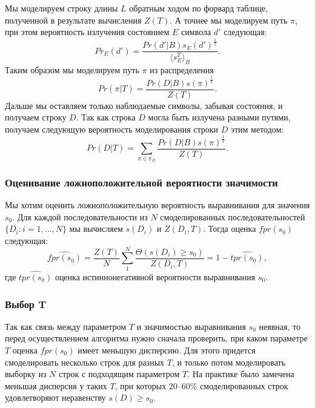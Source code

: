 \documentclass[]{article}
\begin{document}
			Мы моделируем строку длины $L$ обратным ходом по форвард таблице, полученной в результате вычисления $Z(T)$. А точнее мы моделируем путь $\pi$, при этом вероятность излучения состоянием $E$ символа $d'$ следующая:
			\begin{equation}
				Pr_{E}(d') = \frac{Pr(d'|B)s_{E}(d')^{\frac{1}{T}}} {\langle s_{E}^{T} \rangle_{B}}.
			\end{equation}			
			Таким образом мы моделируем путь $\pi$ из распределения 
			\begin{equation}
				Pr(\pi|T) = \frac{Pr(D|B)s(\pi)^{\frac{1}{T}}}{Z(T)}.
			\end{equation}
			Дальше мы оставляем только наблюдаемые символы, забывая состояния, и получаем строку $D$. Так как строка $D$ могла быть излучена разными путями, получаем следующую вероятность моделирования строки $D$ этим методом:
			\begin{equation}				
				Pr(D|T) = \sum_{\pi \in \pi_{D}} \frac{Pr(D|B)s(\pi)^{\frac{1}{T}}}{Z(T)}.
			\end{equation}	
			
			\subsubsection{Оценивание ложноположительной вероятности значимости}			
			Мы хотим оценить ложноположительную вероятность выравнивания для значения $s_{0}$. Для каждой последовательности из $N$ смоделированных последовательностей $\{D_{i}:i=1,\dots,N\}$ мы вычисляем $s(D_{i})$ и $Z(D_{i}, T)$. Тогда оценка $fpr(s_{0})$ следующая:
			\begin{equation}	
				\widehat{fpr(s_{0})} = \frac{Z(T)}{N} \sum_{1}^{N} \frac{\Theta(s(D_{i}) \geq s_{0})}{Z(D_{i}, T)} = 1-\widehat{tpr(s_{0})},
			\end{equation}				
			где $\widehat{tpr(s_{0})}$ оценка истиннонегативной вероятности выравнивания $s_{0}$.
			
			\subsubsection{Выбор T}
			Так как связь между параметром $T$ и значимостью выравнивания $s_{0}$ неявная, то перед осуществлением алгоритма нужно сначала проверить, при каком параметре $T$ оценка $fpr(s_{0})$ имеет меньшую дисперсию. Для этого придется смоделировать несколько строк для разных $T$, и только потом моделировать выборку из $N$ строк с подходящим параметром $T$. На практике было замечена меньшая дисперсия у таких $T$, при которых 20--60$\%$ смоделированных строк удовлетворяют неравенству $s(D) \geq s_{0}$.
			
\end{document}
